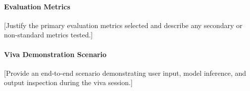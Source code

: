 \paragraph{Evaluation Metrics}
[Justify the primary evaluation metrics selected and describe any secondary or non-standard metrics tested.]

\paragraph{Viva Demonstration Scenario}
[Provide an end-to-end scenario demonstrating user input, model inference, and output inspection during the viva session.]
